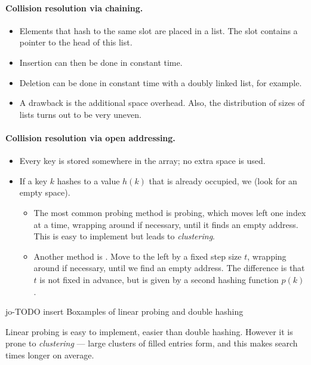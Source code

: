 \paragraph{Collision resolution via chaining.}
\begin{itemize}
\item Elements that hash to the same slot are placed in a list. The slot
contains a pointer to the head of this list. 
\item Insertion can then be done in constant time. 
\item Deletion can be done in constant time with a doubly linked list, for 
example. 
\item A drawback is the additional space overhead. Also, the distribution of 
sizes of lists turns out to be very uneven.
\end{itemize}

\paragraph{Collision resolution via open addressing.}
\begin{itemize}
\item Every key is stored somewhere in the array; no extra space is used.
\item If a key  $k$ hashes to a value $h(k)$ that is already occupied, 
we  (look for an empty space). 
	\begin{itemize}
		\item The most common probing method is  probing, which moves left
		 one index at a time, wrapping around if necessary, until it finds an empty 
		 address. This is easy to implement but leads to \emph{clustering}.
		\item Another method is . Move to the left by a
		fixed step size $t$, wrapping around if necessary, until we find an
		empty address. The difference is that $t$ is not fixed in advance, but
		is given by a second hashing function $p(k)$.
	\end{itemize}
\end{itemize}

jo-TODO insert Boxamples of linear probing and double hashing 


Linear probing is easy to implement, easier than double hashing.
However it is prone to \emph{clustering} --- large clusters of filled entries form, and this makes search times longer on average.



